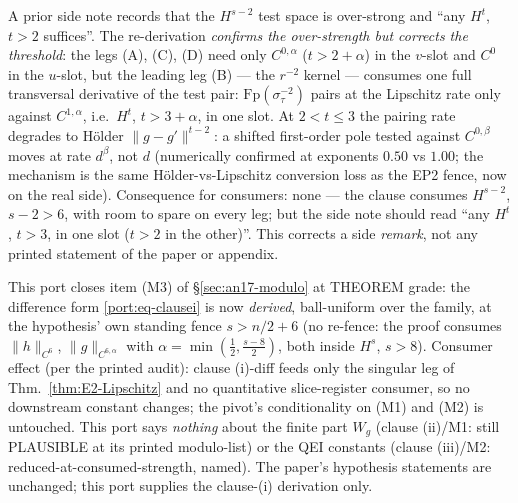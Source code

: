 \begin{remark}\label{port:rem-testspace}
A prior side note records that the $H^{s-2}$ test space is
over-strong and ``any $H^t$, $t>2$ suffices''. The re-derivation
\emph{confirms the over-strength but corrects the threshold}: the legs
(A), (C), (D) need only $C^{0,\alpha}$ ($t>2+\alpha$) in the $v$-slot
and $C^0$ in the $u$-slot, but the leading leg (B) --- the $r^{-2}$
kernel --- consumes one full transversal derivative of the test pair:
$\mathrm{Fp}(\sigma_\tau^{-2})$ pairs at the Lipschitz rate only
against $C^{1,\alpha}$, i.e.\ $H^t$, $t>3+\alpha$, in one slot. At
$2<t\le3$ the pairing rate degrades to H\"older
$\|g-g'\|^{t-2}$: a shifted first-order pole tested against
$C^{0,\beta}$ moves at rate $d^{\beta}$, not $d$ (numerically
confirmed at exponents $0.50$ vs $1.00$; the mechanism is the same
H\"older-vs-Lipschitz conversion loss as the EP2 fence, now on the
real side). Consequence for consumers: none --- the clause consumes
$H^{s-2}$, $s-2>6$, with room to spare on every leg; but the
side note should read ``any $H^t$, $t>3$, in one slot ($t>2$ in the
other)''. This corrects a side \emph{remark}, not any
printed statement of the paper or appendix.
\end{remark}

\begin{remark}
\label{port:rem-grade}
This port closes item (M3) of \S\ref{sec:an17-modulo} at THEOREM grade: the difference form
\eqref{port:eq-clausei} is now \emph{derived}, ball-uniform over the
family, at the hypothesis' own standing fence $s>n/2+6$ (no re-fence:
the proof consumes $\|h\|_{C^6}$, $\|g\|_{C^{6,\alpha}}$ with
$\alpha=\min(\tfrac12,\tfrac{s-8}2)$, both inside $H^{s}$, $s>8$).
Consumer effect (per the printed audit):
clause (i)-diff feeds only the singular leg of
Thm.~\ref{thm:E2-Lipschitz} and no quantitative slice-register consumer, so no
downstream constant changes; the pivot's conditionality on (M1) and
(M2) is untouched. This port says \emph{nothing} about the finite part
$W_g$ (clause (ii)/M1: still PLAUSIBLE at its printed modulo-list) or
the QEI constants (clause (iii)/M2: reduced-at-consumed-strength,
named). The paper's hypothesis statements are unchanged; this port supplies
the clause-(i) derivation only.
\end{remark}

